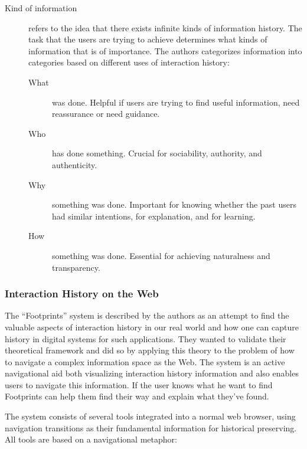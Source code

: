 \documentclass[12pt,a4paper]{article}
\begin{document}
\begin{description}
  \item[Kind of information] refers to the idea that there exists infinite
    kinds of information history. The task that the users are trying to
    achieve determines what kinds of information that is of importance. The
    authors categorizes information into categories based on different uses of
    interaction history:
  \begin{description}
    \item[What] was done. Helpful if users are trying to find useful
      information, need reassurance or need guidance.
    \item[Who] has done something. Crucial for sociability, authority, and
      authenticity. 
    \item[Why] something was done. Important for knowing whether the past users
      had similar intentions, for explanation, and for learning.
    \item[How] something was done. Essential for achieving naturalness and
      transparency.
  \end{description}
\end{description}

\subsubsection{Interaction History on the Web}

The ``Footprints'' system is described by the authors as an attempt to find
the valuable aspects of interaction history in our real world and how one can
capture history in digital systems for such applications. They wanted to
validate their theoretical framework and did so by applying this theory to the
problem of how to navigate a complex information space as the Web. The system
is an active navigational aid both visualizing interaction history
information and also enables users to navigate this information. If the user
knows what he want to find Footprints can help them find their way and
explain what they've found.

The system consists of several tools integrated into a normal web browser,
using navigation transitions as their fundamental information for historical
preserving. All tools are based on a navigational metaphor:
\end{document}
